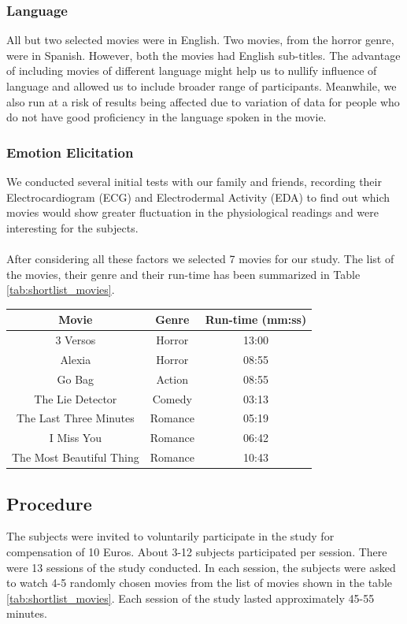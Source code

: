 \subsubsection{Language} All but two selected movies were in English. Two movies, from the horror genre, were in Spanish. However, both the movies had English sub-titles. The advantage of including movies of different language might help us to nullify influence of language and allowed us to include broader range of participants. Meanwhile, we also run at a risk of results being affected due to variation of data for people who do not have good proficiency in the language spoken in the movie. 
\subsubsection{Emotion Elicitation} We conducted several initial tests with our family and friends, recording their Electrocardiogram (ECG) and Electrodermal Activity (EDA) to find out which movies would show greater fluctuation in the physiological readings and were interesting for the subjects.

\paragraph{} After considering all these factors we selected 7 movies for our study. The list of the movies, their genre and their run-time has been summarized in Table \ref{tab:shortlist_movies}.

\begin{center}
\begin{tabular}{ |c|c|c| }
\hline
Movie & Genre & Run-time (mm:ss) \\
\hline
\hline
3 Versos & Horror & 13:00 \\
\hline
Alexia & Horror & 08:55 \\
\hline
Go Bag & Action & 08:55 \\
\hline
The Lie Detector & Comedy & 03:13 \\
\hline
The Last Three Minutes & Romance & 05:19 \\
\hline
I Miss You & Romance & 06:42 \\
\hline
The Most Beautiful Thing & Romance & 10:43 \\
\hline
\end{tabular}
\label{tab:shortlist_movies}
\end{center}

\subsection{Procedure}
\label{sec:procedure}
The subjects were invited to voluntarily participate in the study for compensation of 10 Euros. About 3-12 subjects participated per session. There were 13 sessions of the study conducted. In each session, the subjects were asked to watch 4-5 randomly chosen movies from the list of movies shown in the table \ref{tab:shortlist_movies}. Each session of the study lasted approximately 45-55 minutes.
